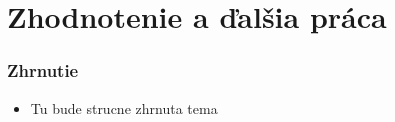 \documentclass{beamer}
\begin{document}
\section*{Zhodnotenie a ďalšia práca}

\begin{frame}[fragile=singleslide]\frametitle{Zhrnutie}
\begin{itemize}
\item Tu bude strucne zhrnuta tema 
\end{itemize}
\end{frame}
\end{document}
